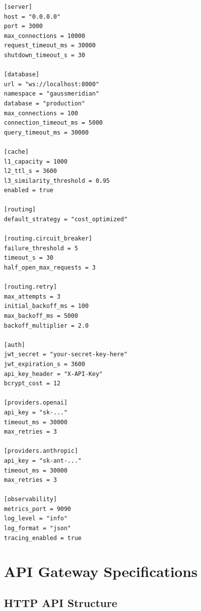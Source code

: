 \documentclass[12pt,a4paper,twoside]{report}
\begin{document}
\begin{lstlisting}[caption={Example config.toml}]
[server]
host = "0.0.0.0"
port = 3000
max_connections = 10000
request_timeout_ms = 30000
shutdown_timeout_s = 30

[database]
url = "ws://localhost:8000"
namespace = "gaussmeridian"
database = "production"
max_connections = 100
connection_timeout_ms = 5000
query_timeout_ms = 30000

[cache]
l1_capacity = 1000
l2_ttl_s = 3600
l3_similarity_threshold = 0.95
enabled = true

[routing]
default_strategy = "cost_optimized"

[routing.circuit_breaker]
failure_threshold = 5
timeout_s = 30
half_open_max_requests = 3

[routing.retry]
max_attempts = 3
initial_backoff_ms = 100
max_backoff_ms = 5000
backoff_multiplier = 2.0

[auth]
jwt_secret = "your-secret-key-here"
jwt_expiration_s = 3600
api_key_header = "X-API-Key"
bcrypt_cost = 12

[providers.openai]
api_key = "sk-..."
timeout_ms = 30000
max_retries = 3

[providers.anthropic]
api_key = "sk-ant-..."
timeout_ms = 30000
max_retries = 3

[observability]
metrics_port = 9090
log_level = "info"
log_format = "json"
tracing_enabled = true
\end{lstlisting}


\chapter{API Gateway Specifications}

\section{HTTP API Structure}
\end{document}
